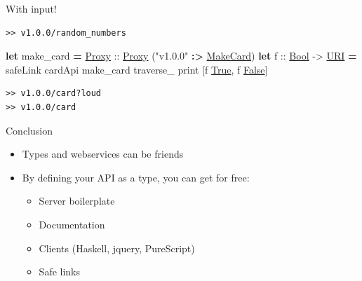 \documentclass[ignorenonframetext,]{beamer}
\newenvironment{Shaded}{}{}
\newcommand{\KeywordTok}[1]{\textcolor[rgb]{0.26,0.66,0.93}{\textbf{{#1}}}}
\newcommand{\DataTypeTok}[1]{\underline{{#1}}}
\newcommand{\StringTok}[1]{\textcolor[rgb]{0.02,0.61,0.04}{{#1}}}
\newcommand{\OtherTok}[1]{{#1}}
\newcommand{\FunctionTok}[1]{\textcolor[rgb]{1.00,0.58,0.35}{\textbf{{#1}}}}
\newcommand{\NormalTok}[1]{{#1}}
\begin{document}
\begin{frame}[fragile]{With input!}

\begin{Shaded}
\end{Shaded}

\pause

\begin{verbatim}
>> v1.0.0/random_numbers
\end{verbatim}

\pause

\begin{Shaded}
\begin{Highlighting}[]

\KeywordTok{let} \NormalTok{make_card }\FunctionTok{=} \DataTypeTok{Proxy}\OtherTok{ ::} \DataTypeTok{Proxy} \NormalTok{(}\StringTok{"v1.0.0"} \FunctionTok{:>} \DataTypeTok{MakeCard}\NormalTok{)}
\KeywordTok{let}\OtherTok{ f ::} \DataTypeTok{Bool} \OtherTok{->} \DataTypeTok{URI} \FunctionTok{=} \NormalTok{safeLink cardApi make_card}
\NormalTok{traverse_ print [f }\DataTypeTok{True}\NormalTok{, f }\DataTypeTok{False}\NormalTok{]}
\end{Highlighting}
\end{Shaded}

\pause

\begin{verbatim}
>> v1.0.0/card?loud
>> v1.0.0/card
\end{verbatim}

\end{frame}

\begin{frame}{Conclusion}

\begin{itemize}[<+->]
\itemsep1pt\parskip0pt
\item
  Types and webservices can be friends
\item
  By defining your API as a type, you can get for free:

  \begin{itemize}[<+->]
  \itemsep1pt\parskip0pt
  \item
    Server boilerplate
  \item
    Documentation
  \item
    Clients (Haskell, jquery, PureScript)
  \item
    Safe links
  \end{itemize}
\end{itemize}

\end{frame}
\end{document}
